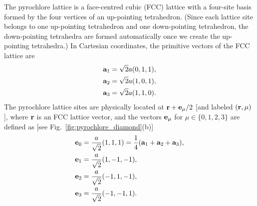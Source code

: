 \documentclass[twocolumn,superscriptaddress,amsmath,amssymb,aps,prx,nofootinbib]{revtex4-2}
\begin{document}
The pyrochlore lattice is a face-centred cubic (FCC) lattice with a four-site basis formed by the four vertices of an up-pointing tetrahedron. (Since each lattice site belongs to one up-pointing tetrahedron and one down-pointing tetrahedron, the down-pointing tetrahedra are formed automatically once we create the up-pointing tetrahedra.) In Cartesian coordinates, the primitive vectors of the FCC lattice are 
\begin{equation}
\begin{aligned}
    \vb{a}_1&=\sqrt{2}a(0,1,1),\\
    \vb{a}_2&=\sqrt{2}a(1,0,1),\\
    \vb{a}_3&=\sqrt{2}a(1,1,0).
\end{aligned}
\end{equation}
The pyrochlore lattice sites are physically located at $\vb{r}+\vb{e}_\mu/2$ [and labeled $(\vb{r},\mu)$], where $\vb{r}$ is an FCC lattice vector, and the vectors $\vb{e}_\mu$ for $\mu \in \{ 0,1,2,3 \}$ are defined as [see Fig.~\ref{fig:pyrochlore_diamond}(b)]
\begin{equation}
\begin{aligned}
    \vb{e}_0&=\frac{a}{\sqrt{2}}(1,1,1) = \frac{1}{4}(\vb{a}_1+\vb{a}_2 + \vb{a}_3),\\
    \vb{e}_1&=\frac{a}{\sqrt{2}}(1,-1,-1),\\
    \vb{e}_2&=\frac{a}{\sqrt{2}}(-1,1,-1),\\
    \vb{e}_3&=\frac{a}{\sqrt{2}}(-1,-1,1).
\end{aligned}
\end{equation}
\end{document}
